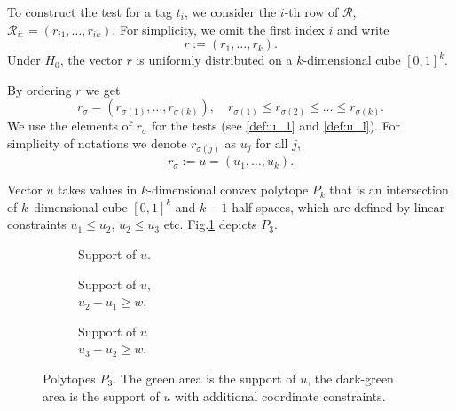 \documentclass{llncs}
\begin{document}
To construct the test for a tag $t_i$, we consider the $i$-th row of $\mathcal{R}$, $\mathcal{R}_{i:} = (r_{i1}, \dots, r_{ik})$. For simplicity, we omit the first index $i$ and write
\[
r := (r_{1}, \dots, r_{k}).
\]
Under $H_0$, the vector $r$ is uniformly distributed on a $k$-dimensional cube $[0, 1]^{k}$.

By ordering $r$ we get
\[
r_{\sigma} = (r_{\sigma(1)}, \dots, r_{\sigma(k)}), 
\quad
r_{\sigma(1)} \leq r_{\sigma(2)} \leq \dots \leq r_{\sigma(k)}.
\]
We use the elements of $r_{\sigma}$ for the tests (see \eqref{def:u_1} and \eqref{def:u_l}). For simplicity of notations we denote $r_{\sigma(j)}$ as $u_j$ for all $j$,
\begin{equation}
\label{def:u}
    r_{\sigma} := u = (u_1, \dots, u_k).
\end{equation}


Vector $u$ takes values in $k$-dimensional convex polytope $P_k$ that is 
an intersection of $k$--dimensional cube $[0, 1]^{k}$ and 
$k-1$ half-spaces, which are defined by linear constraints $u_1 \le u_2$, $u_2 \le u_3$ etc.
Fig.\ref{fig:polytop} depicts $P_3$. 
\begin{figure}
     \centering
     \begin{subfigure}[b]{0.3\textwidth}
         \centering 
         \caption{Support of $u$.
         \\\hspace{\textwidth} }
         \label{fig:polytop}
     \end{subfigure}
     \begin{subfigure}[b]{0.3\textwidth}
         \centering 
         \caption{Support of $u$, 
         \\\hspace{\textwidth}
         $u_2 - u_1 \ge w$.}
         \label{fig:polytop1}
     \end{subfigure}
     \begin{subfigure}[b]{0.3\textwidth}
         \centering 
         \caption{Support of $u$ \\\hspace{\textwidth}$u_3 - u_2 \ge w$.}
         \label{fig:polytop2}
     \end{subfigure}
    \caption{Polytopes $P_3$. The green area is the support of $u$, the dark-green area is the support of $u$ with additional coordinate constraints.}
\end{figure}
\end{document}
